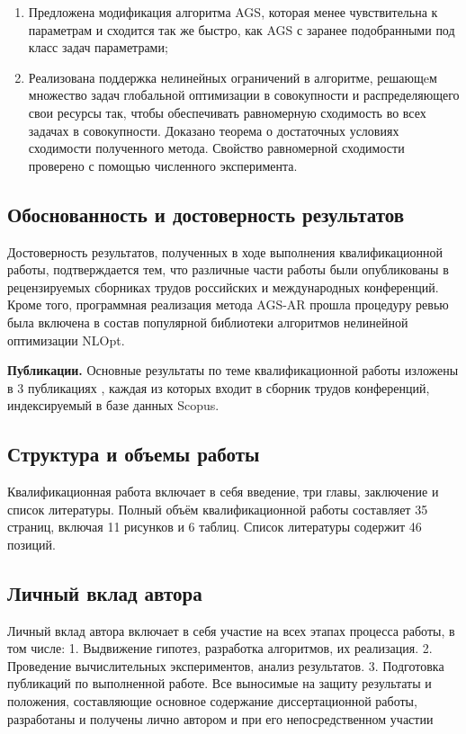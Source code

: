 \begin{enumerate}
    \item Предложена модификация алгоритма AGS, которая менее чувствительна к параметрам и сходится так же быстро, как AGS
    с заранее подобранными под класс задач параметрами;
    \item Реализована поддержка нелинейных ограничений в алгоритме, решающeм
    множество задач глобальной оптимизации в совокупности и распределяющего свои ресурсы так, чтобы
    обеспечивать равномерную сходимость во всех задачах в совокупности. Доказано теорема о достаточных условиях сходимости
    полученного метода. Свойство равномерной сходимости проверено с помощью численного эксперимента.
\end{enumerate}

\subsection*{Обоснованность и достоверность результатов}
Достоверность результатов, полученных в ходе выполнения квалификационной работы, подтверждается
тем, что различные части работы были опубликованы в рецензируемых сборниках трудов российских и международных конференций.
Кроме того, программная реализация метода AGS-AR прошла процедуру ревью была включена в состав популярной библиотеки
алгоритмов нелинейной оптимизации NLOpt.

\textbf{Публикации.} Основные результаты по теме квалификационной работы изложены в 3 публикациях \cite{barkalovSovraov2019,sovrasov2019,sovrasov2020},
каждая из которых входит в сборник трудов конференций, индексируемый в базе данных Scopus.

\subsection*{Структура и объемы работы}

Квалификационная работа включает в себя введение, три главы, заключение и список литературы.
Полный объём квалификационной работы составляет 35 страниц, включая 11 рисунков и 6 таблиц.
Список литературы содержит 46 позиций.

\subsection*{Личный вклад автора}

Личный вклад автора включает в себя участие на всех этапах процесса работы, в том числе:
1. Выдвижение гипотез, разработка алгоритмов, их реализация.
2. Проведение вычислительных экспериментов, анализ результатов.
3. Подготовка публикаций по выполненной работе.
Все выносимые на защиту результаты и положения, составляющие основное содержание диссертационной работы,
разработаны и получены лично автором и при его непосредственном участии
